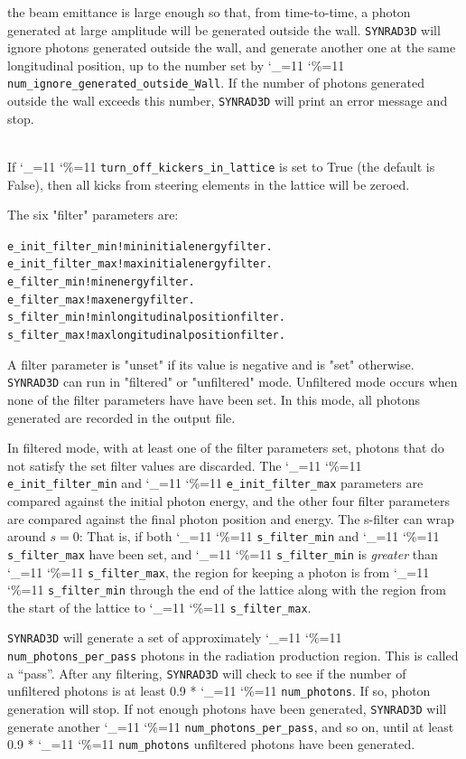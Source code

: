 \documentclass[11pt]{article}
\newcommand{\srthree}{\texttt{SYNRAD3D}\xspace}
\newcommand\ttcmd{\begingroup\catcode`\_=11 \catcode`\%=11 \dottcmd}
\newcommand\dottcmd[1]{\texttt{#1}\endgroup}
\newcommand{\vn}{\ttcmd}
\newcommand{\Newline}{\hfil \\}
\newlength{\ExBeg}
\newlength{\ExEnd}
\newenvironment{example}
  {\vspace{\ExBeg} \begin{alltt}}
  {\end{alltt} \vspace{\ExEnd}}
\begin{document}
\begin{description}
the beam emittance is large enough so that, from time-to-time, a
photon generated at large amplitude will be generated outside the
wall. \srthree will ignore photons generated outside the wall, and
generate another one at the same longitudinal position, up to the
number set by \vn{num_ignore_generated_outside_Wall}. If the number of
photons generated outside the wall exceeds this number, \srthree will
print an error message and stop.
  \item[\vn{turn_off_kickers_in_lattice}] \Newline
If \vn{turn_off_kickers_in_lattice} is set to True (the default is
False), then all kicks from steering elements in the lattice will be zeroed.

\end{description}

The six "filter" parameters are:
\begin{example}
  e_init_filter_min   ! min initial energy filter.
  e_init_filter_max   ! max initial energy filter.
  e_filter_min        ! min energy filter.
  e_filter_max        ! max energy filter.
  s_filter_min        ! min longitudinal position filter.
  s_filter_max        ! max longitudinal position filter.
\end{example}
A filter parameter is "unset" if its value is negative and is "set"
otherwise.  \srthree can run in "filtered" or "unfiltered"
mode. Unfiltered mode occurs when none of the filter parameters have
have been set. In this mode, all photons generated are recorded in
the output file.

In filtered mode, with at least one of the filter parameters set,
photons that do not satisfy the set filter values are discarded. The
\vn{e_init_filter_min} and \vn{e_init_filter_max} parameters are 
compared against the initial photon energy, and the other four
filter parameters are compared against the final photon position and
energy. The s-filter can wrap around $s = 0$: That is,
if both \vn{s_filter_min} and \vn{s_filter_max} have been set,
and \vn{s_filter_min} is {\em greater} than \vn{s_filter_max}, the region
for keeping a photon is from \vn{s_filter_min} through the end of the
lattice along with the region from the start of the lattice to
\vn{s_filter_max}.

\srthree will generate a set of approximately
\vn{num_photons_per_pass} photons in the radiation production region.
This is called a ``pass''.  After any filtering, \srthree will check
to see if the number of unfiltered photons is at least 0.9 *
\vn{num_photons}. If so, photon generation will stop. If not enough
photons have been generated, \srthree will generate another
\vn{num_photons_per_pass}, and so on, until at least 0.9 *
\vn{num_photons} unfiltered photons have been generated.
\end{document}
